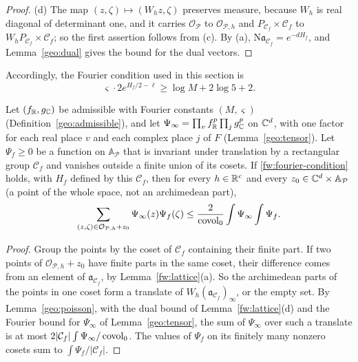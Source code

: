 \begin{proof}
(d) The map $(z,\zeta)\mapsto(W_hz,\zeta)$ preserves measure, because
$W_h$ is real diagonal of determinant one, and it carries $\mathcal O_{\mathcal P}$ to
$\mathcal O_{\mathcal P,h}$ and $P_{\mathcal C_f}\times\mathcal C_f$ to $W_hP_{\mathcal C_f}\times\mathcal C_f$; so the first assertion follows from (c). By (a),
$\mathrm N\mathfrak a_{\mathcal C_f}=e^{-dH_f}$, and Lemma~\ref{geo:dual} gives the bound for
the dual vectors.
\end{proof}

Accordingly, the Fourier condition used in this section is
\begin{equation}\label{fw:fourier-condition}
 \varsigma\cdot2e^{H_f/2-\ell}\ge\log M+2\log5+2 .
\end{equation}

\begin{lemma}\label{fw:counting}
Let $(f_\mathbb R,g_\mathbb C)$ be admissible with Fourier constants $(M,\varsigma)$
(Definition~\ref{geo:admissible}), and
let $\Psi_\infty=\prod_vf_\mathbb R^p\prod_jg_\mathbb C^p$ on $\mathbb C^d$, with one factor
for each real place $v$ and each complex place $j$ of $F$
(Lemma~\ref{geo:tensor}). Let $\Psi_f\ge0$ be a function on $\mathbb
A_{\mathcal P}$ that is invariant under translation by a rectangular
group $\mathcal C_f$ and vanishes outside a finite union of its cosets.
If \eqref{fw:fourier-condition} holds, with $H_f$ defined by this
$\mathcal C_f$, then for every $h\in\mathbb R^c$ and every
$z_0\in\mathbb C^d\times\mathbb A_{\mathcal P}$ (a point of the whole space,
not an archimedean part),
\begin{equation}\label{fw:weighted-count}
 \sum_{(z,\zeta)\in\mathcal O_{\mathcal P,h}+z_0}\Psi_\infty(z)\Psi_f(\zeta)
 \le\frac2{\operatorname{covol}_0}\int\Psi_\infty\int\Psi_f .
\end{equation}
\end{lemma}

\begin{proof}
Group the points by the coset of $\mathcal C_f$ containing their finite
part. If two points of $\mathcal O_{\mathcal P,h}+z_0$ have finite parts in the same
coset, their difference comes from an element of $\mathfrak a_{\mathcal C_f}$, by
Lemma~\ref{fw:lattice}(a). So the archimedean parts of the points in one
coset form a translate of $W_h(\mathfrak a_{\mathcal C_f})_\infty$, or the empty set. By
Lemma~\ref{geo:poisson}, with the dual bound of
Lemma~\ref{fw:lattice}(d) and the Fourier bound for $\Psi_\infty$ of
Lemma~\ref{geo:tensor}, the sum of $\Psi_\infty$ over such a translate
is at most $2|\mathcal C_f|\int\Psi_\infty/\operatorname{covol}_0$. The values of
$\Psi_f$ on its finitely many nonzero cosets sum to
$\int\Psi_f/|\mathcal C_f|$.
\end{proof}

